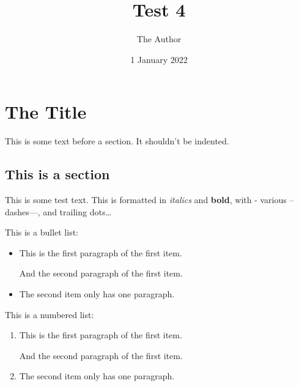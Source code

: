 \documentclass[
  12pt,
  a4paper,
]{article}
\title{Test 4}
\author{The Author}
\date{1 January 2022}
\begin{document}
\maketitle

\frenchspacing

\newcommand{\sectionbreak}{\clearpage}

\thispagestyle{empty}

\thispagestyle{empty}

{
\hypersetup{linkcolor=}
\setcounter{tocdepth}{1}
\tableofcontents
}

\hypertarget{__h1_1}{%
\section{The Title}\label{__h1_1}}

\makeatletter
\@afterindentfalse
\@afterheading
\makeatother

This is some text before a section. It shouldn't be indented.

\hypertarget{__h2_1}{%
\subsection{This is a section}\label{__h2_1}}

\makeatletter
\@afterindentfalse
\@afterheading
\makeatother

This is some test text. This is formatted in \emph{italics} and
\textbf{bold}, with - various -- dashes---, and trailing dots\ldots{}

This is a bullet list:

\begin{itemize}
\item
  This is the first paragraph of the first item.

  And the second paragraph of the first item.
\item
  The second item only has one paragraph.
\end{itemize}

\makeatletter
\@afterindentfalse
\@afterheading
\makeatother

This is a numbered list:

\begin{enumerate}
\def\labelenumi{\arabic{enumi}.}
\item
  This is the first paragraph of the first item.

  And the second paragraph of the first item.
\item
  The second item only has one paragraph.
\end{enumerate}
\end{document}
